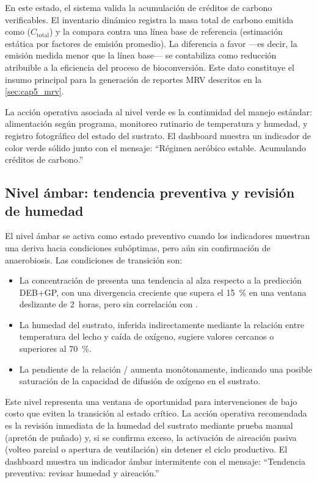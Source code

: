 En este estado, el sistema valida la acumulación de créditos de carbono verificables. El inventario dinámico registra la masa total de carbono emitida como  ($C_{\text{total}}$) y la compara contra una línea base de referencia (estimación estática por factores de emisión promedio). La diferencia a favor —es decir, la emisión medida menor que la línea base— se contabiliza como reducción atribuible a la eficiencia del proceso de bioconversión. Este dato constituye el insumo principal para la generación de reportes MRV descritos en la \cref{sec:cap5_mrv}.

La acción operativa asociada al nivel verde es la continuidad del manejo estándar: alimentación según programa, monitoreo rutinario de temperatura y humedad, y registro fotográfico del estado del sustrato. El dashboard muestra un indicador de color verde sólido junto con el mensaje: ``Régimen aeróbico estable. Acumulando créditos de carbono.''

\subsection{Nivel ámbar: tendencia preventiva y revisión de humedad}
\label{subsec:cap5_ambar}

El nivel ámbar se activa como estado preventivo cuando los indicadores muestran una deriva hacia condiciones subóptimas, pero aún sin confirmación de anaerobiosis. Las condiciones de transición son:

\begin{itemize}
    \item La concentración de  presenta una tendencia al alza respecto a la predicción DEB+GP, con una divergencia creciente que supera el \num{15}~\% en una ventana deslizante de \num{2}~horas, pero sin correlación con .
    \item La humedad del sustrato, inferida indirectamente mediante la relación entre temperatura del lecho y caída de oxígeno, sugiere valores cercanos o superiores al \num{70}~\%.
    \item La pendiente de la relación / aumenta monótonamente, indicando una posible saturación de la capacidad de difusión de oxígeno en el sustrato.
\end{itemize}

Este nivel representa una ventana de oportunidad para intervenciones de bajo costo que eviten la transición al estado crítico. La acción operativa recomendada es la revisión inmediata de la humedad del sustrato mediante prueba manual (apretón de puñado) y, si se confirma exceso, la activación de aireación pasiva (volteo parcial o apertura de ventilación) sin detener el ciclo productivo. El dashboard muestra un indicador ámbar intermitente con el mensaje: ``Tendencia preventiva: revisar humedad y aireación.''

